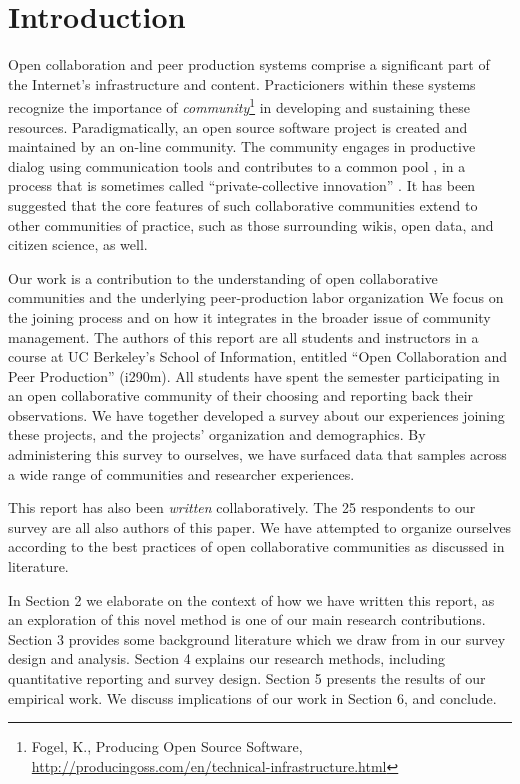 \section{Introduction}

Open collaboration and peer production systems comprise a significant
part of the Internet's infrastructure and content.
Practicioners within these systems recognize the importance of
\emph{community}\footnote{Fogel, K., Producing Open Source Software, \url{http://producingoss.com/en/technical-infrastructure.html}} in developing and sustaining these resources.
Paradigmatically, an open source software project is created and maintained by an on-line community.
The community engages in productive dialog using communication tools and contributes to
a common pool \cite{ostrom1990}, in a process that is sometimes called ``private-collective innovation'' \cite{vonhippel2003oss}.
It has been suggested that the core features of such collaborative
communities extend to other communities of practice, such as those
surrounding wikis, open data, and citizen science, as well.

Our work is a contribution to the understanding of  open collaborative
communities and the underlying peer-production labor organization \cite{benkler2002}
We focus on the joining process and on how
it integrates in the broader issue of community management.
The authors of this report are all students and instructors in a
course at UC Berkeley's School of Information, entitled ``Open Collaboration and Peer Production'' (i290m).
All students have spent the semester participating in an open
collaborative community of their choosing and reporting back
their observations.
We have together developed a survey about our experiences joining
these projects, and the projects' organization and demographics.
By administering this survey to ourselves, we have surfaced data
that samples across a wide range of communities and researcher experiences.



This report has also been \emph{written} collaboratively.
The 25 respondents to our survey are all also authors of this paper.
We have attempted to organize ourselves according
to the best practices of open collaborative communities as discussed in literature.


In Section 2 we elaborate on the context of how we have written this report, as an exploration of this novel method is one of our main research contributions.
Section 3 provides some background literature which we draw from in
our survey design and analysis.
Section 4 explains our research methods, including quantitative
reporting and survey design.
Section 5 presents the results of our empirical work.
We discuss implications of our work in Section 6, and conclude. 


